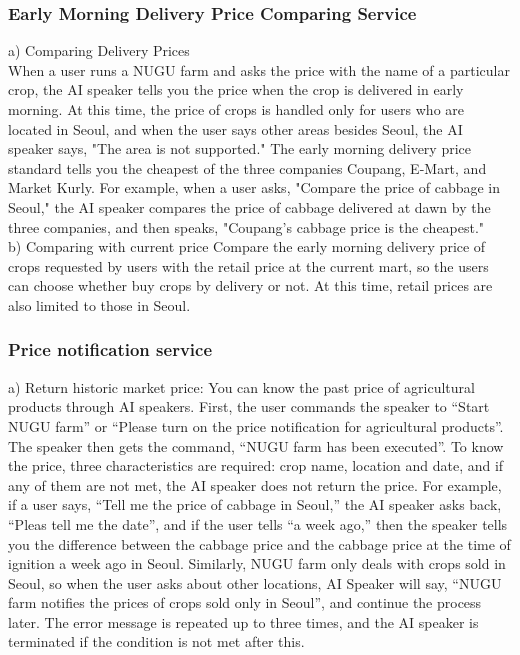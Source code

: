 \documentclass[conference]{IEEEtran}
\begin{document}
\subsubsection{Early Morning Delivery Price Comparing Service}
{a) Comparing Delivery Prices\\
When a user runs a NUGU farm and asks the price with the name of a particular crop, the AI speaker tells you the price when the crop is delivered in early morning. At this time, the price of crops is handled only for users who are located in Seoul, and when the user says other areas besides Seoul, the AI speaker says, "The area is not supported." The early morning delivery price standard tells you the cheapest of the three companies Coupang, E-Mart, and Market Kurly. For example, when a user asks, "Compare the price of cabbage in Seoul," the AI speaker compares the price of cabbage delivered at dawn by the three companies, and then speaks, "Coupang's cabbage price is the cheapest."}\\
\newline
{b) Comparing with current price
Compare the early morning delivery price of crops requested by users with the retail price at the current mart, so the users can choose whether buy crops by delivery or not. At this time, retail prices are also limited to those in Seoul.}

\subsubsection{Price notification service}
 a) Return historic market price:
You can know the past price of agricultural products through AI speakers. First, the user commands the speaker to “Start NUGU farm” or “Please turn on the price notification for agricultural products”. The speaker then gets the command, “NUGU farm has been executed”. To know the price, three characteristics are required: crop name, location and date, and if any of them are not met, the AI speaker does not return the price. For example, if a user says, “Tell me the price of cabbage in Seoul,” the AI speaker asks back, “Pleas tell me the date”, and if the user tells “a week ago,” then the speaker tells you the difference between the cabbage price and the cabbage price at the time of ignition a week ago in Seoul. Similarly, NUGU farm only deals with crops sold in Seoul, so when the user asks about other locations, AI Speaker will say, “NUGU farm notifies the prices of crops sold only in Seoul”, and continue the process later. The error message is repeated up to three times, and the AI speaker is terminated if the condition is not met after this.
\end{document}
